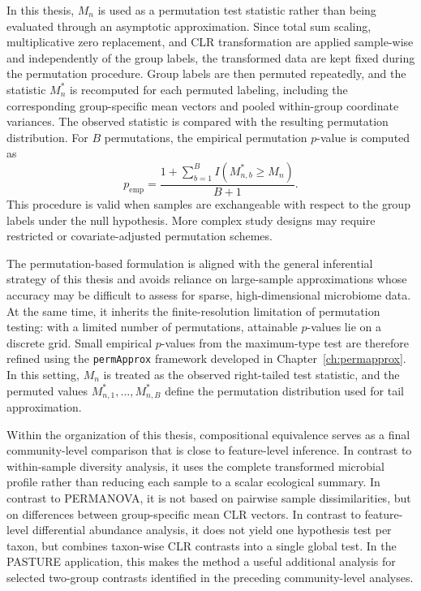 In this thesis, $M_n$ is used as a permutation test statistic rather than being evaluated through an asymptotic approximation. Since total sum scaling, multiplicative zero replacement, and CLR transformation are applied sample-wise and independently of the group labels, the transformed data are kept fixed during the permutation procedure. Group labels are then permuted repeatedly, and the statistic $M_n^\ast$ is recomputed for each permuted labeling, including the corresponding group-specific mean vectors and pooled within-group coordinate variances. The observed statistic is compared with the resulting permutation distribution. For $B$ permutations, the empirical permutation $p$-value is computed as
\begin{equation}
	p_{\mathrm{emp}} = \frac{1+\sum_{b=1}^{B} I\left(M_{n,b}^\ast \geq M_n\right)} {B+1}.
	\label{eq:3community:comp_equivalence:empirical_pvalue}
\end{equation}
This procedure is valid when samples are exchangeable with respect to the group labels under the null hypothesis. More complex study designs may require restricted or covariate-adjusted permutation schemes.

The permutation-based formulation is aligned with the general inferential strategy of this thesis and avoids reliance on large-sample approximations whose accuracy may be difficult to assess for sparse, high-dimensional microbiome data. At the same time, it inherits the finite-resolution limitation of permutation testing: with a limited number of permutations, attainable $p$-values lie on a discrete grid. Small empirical $p$-values from the maximum-type test are therefore refined using the \texttt{permApprox} framework developed in Chapter~\ref{ch:permapprox}. In this setting, $M_n$ is treated as the observed right-tailed test statistic, and the permuted values $M_{n,1}^\ast,\ldots,M_{n,B}^\ast$ define the permutation distribution used for tail approximation.

Within the organization of this thesis, compositional equivalence serves as a final community-level comparison that is close to feature-level inference. In contrast to within-sample diversity analysis, it uses the complete transformed microbial profile rather than reducing each sample to a scalar ecological summary. In contrast to PERMANOVA, it is not based on pairwise sample dissimilarities, but on differences between group-specific mean CLR vectors. In contrast to feature-level differential abundance analysis, it does not yield one hypothesis test per taxon, but combines taxon-wise CLR contrasts into a single global test. In the PASTURE application, this makes the method a useful additional analysis for selected two-group contrasts identified in the preceding community-level analyses.

